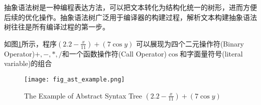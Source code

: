 抽象语法树是一种编程表达方法，可以把文本转化为结构化统一的树形，进而方便后续的优化操作。抽象语法树广泛用于编译器的构建过程，解析文本构建抽象语法树往往是所有编译过程的第一步。

如图\ref{fig:ast_example}所示，程序$(2.2-\frac{x}{11})+(7\cos{y})$ 可以展现为四个二元操作符(Binary Operator)$+,-,*,/$和一个函数操作符(Call Operator)$\cos$和字面量符号(literal variable)的组合

\begin{figure}[H]
    \centering
        \texttt{[image: fig\_ast\_example.png]}
        \caption{The Example of Abstract Syntax Tree $(2.2-\frac{x}{11})+(7\cos{y})$}
    \label{fig:ast_example}
\end{figure}

